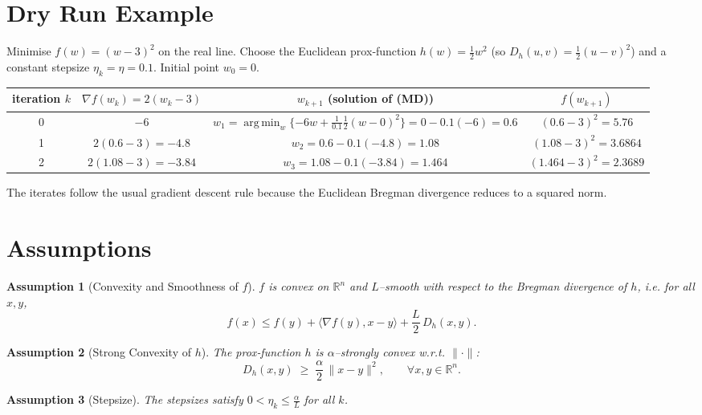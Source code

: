 \documentclass{article}
\newtheorem{assumption}{Assumption}
\newcommand{\argmin}{\operatorname*{arg\,min}}
\newcommand{\ip}[2]{\langle #1,#2\rangle}
\newcommand{\DD}[2]{D_{h}(#1,#2)}
\newcommand{\grad}{\nabla}
\begin{document}
\section*{Dry Run Example}
Minimise \(f(w)=(w-3)^2\) on the real line.  
Choose the Euclidean prox‑function \(h(w)=\tfrac12 w^2\) (so \(\DD{u}{v}= \tfrac12 (u-v)^2\))
and a constant stepsize \(\eta_k=\eta=0.1\).  
Initial point \(w_0=0\).

\begin{center}
\begin{tabular}{c|c|c|c}
iteration $k$ & $\grad f(w_k)=2(w_k-3)$ & $w_{k+1}$ (solution of (MD)) & $f(w_{k+1})$\\ \hline
0 & $-6$ &
\(
w_{1}= \argmin_w\{-6w+\tfrac1{0.1}\tfrac12(w-0)^2\}=0-0.1(-6)=0.6
\) & $(0.6-3)^2=5.76$\\[4pt]
1 & $2(0.6-3)=-4.8$ &
\(
w_{2}=0.6-0.1(-4.8)=1.08
\) & $(1.08-3)^2=3.6864$\\[4pt]
2 & $2(1.08-3)=-3.84$ &
\(
w_{3}=1.08-0.1(-3.84)=1.464
\) & $(1.464-3)^2=2.3689$\\
\end{tabular}
\end{center}
The iterates follow the usual gradient descent rule because the Euclidean Bregman
divergence reduces to a squared norm.

\section*{Assumptions}
\begin{assumption}[Convexity and Smoothness of $f$]\label{ass:f}
$f$ is convex on $\mathbb{R}^{n}$ and $L$–smooth with respect to the Bregman
divergence of $h$, i.e. for all $x,y$,
\[
f(x)\le f(y)+\ip{\grad f(y)}{x-y}+\frac{L}{2}\,\DD{x}{y}.
\tag{A1}
\]
\end{assumption}

\begin{assumption}[Strong Convexity of $h$]\label{ass:h}
The prox‑function $h$ is $\alpha$–strongly convex w.r.t. $\|\cdot\|$:
\[
\DD{x}{y}\;\ge\;\frac{\alpha}{2}\,\|x-y\|^{2},
\qquad\forall x,y\in\mathbb{R}^{n}.
\tag{A2}
\]
\end{assumption}

\begin{assumption}[Stepsize]\label{ass:eta}
The stepsizes satisfy \(0<\eta_k\le \frac{\alpha}{L}\) for all $k$.
\end{assumption}
\end{document}
